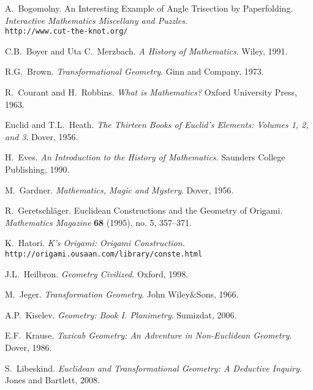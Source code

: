 
\begin{fullwidth}

\begin{thebibliography}{99}


 A.\ Bogomolny. An Interesting Example of Angle Trisection by Paperfolding. \emph{Interactive Mathematics Miscellany and Puzzles}.
\\ \texttt{http://www.cut-the-knot.org/}

 C.B.\ Boyer and Uta C.\ Merzbach. \emph{A History of Mathematics}. Wiley, 1991.

 R.G.\ Brown. \emph{Transformational Geometry}. Ginn and Company, 1973.

 R.\ Courant and H.\ Robbins. \emph{What is
  Mathematics?} Oxford University Press, 1963.

 Euclid and T.L.\ Heath. \emph{The Thirteen Books of Euclid's Elements: Volumes 1, 2, and 3}. Dover, 1956. 

 H.\ Eves. \emph{An Introduction to the History of Mathematics}. Saunders College Publishing, 1990.

 M.\ Gardner. \emph{Mathematics, Magic and Mystery}. Dover, 1956.

 R.\ Geretschl\"ager. Euclidean Constructions
  and the Geometry of Origami. \textit{Mathematics Magazine}
  \textbf{68} (1995), no. 5, 357--371.

 K.\ Hatori. \emph{K's Origami: Origami Construction.}
\\ \texttt{http://origami.ousaan.com/library/conste.html}

 J.L.\ Heilbron. \emph{Geometry Civilized}. Oxford, 1998.

 M.\ Jeger. \emph{Transformation Geometry}. John Wiley\&Sons, 1966.

 A.P.\ Kiselev. \emph{Geometry: Book
  I. Planimetry}. Sumizdat, 2006.

 E.F.\ Krause. \emph{Taxicab Geometry: An Adventure in Non-Euclidean Geometry}. Dover, 1986.

 S.\ Libeskind. \emph{Euclidean and
  Transformational Geometry: A Deductive Inquiry}. Jones and Bartlett,
  2008.


\end{thebibliography}
\end{fullwidth}
